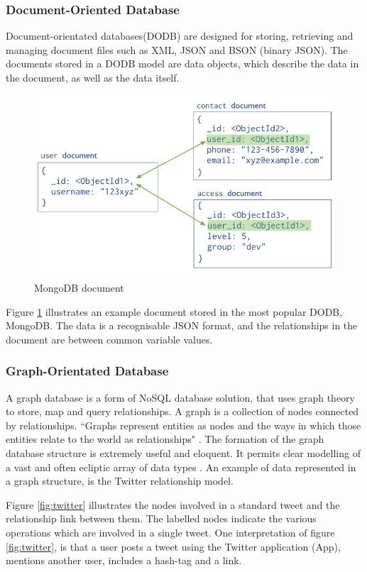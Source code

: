 \subsubsection{Document-Oriented Database}
Document-orientated databases(DODB) are designed for storing, retrieving and managing document files such as XML, JSON and BSON (binary JSON). The documents stored in a DODB model are data objects, which describe the data in the document, as well as the data itself. \begin{figure}[H]\begin{center}\includegraphics[width=0.75\linewidth]{images/mongodbmodel}\caption{MongoDB document}\label{fig:mongo}\end{center}\end{figure} Figure \ref{fig:mongo} illustrates an example document stored in the most popular DODB, MongoDB. The data is a recognisable JSON format, and the relationships in the document are between common variable values.

\subsubsection{Graph-Orientated Database}
A graph database is a form of NoSQL database solution, that uses graph theory to store, map and query relationships. A graph is a collection of nodes connected by relationships. ``Graphs represent entities as nodes and the ways in which those entities relate to the world as relationships" \cite{gd}. The formation of the graph database structure is extremely useful and eloquent. It permits clear modelling of a vast and often ecliptic array of data types \cite{gd}. An example of data represented in a graph structure, is the Twitter relationship model. 

Figure \ref{fig:twitter} illustrates the nodes involved in a standard tweet and the relationship link between them. The labelled nodes indicate the various operations which are involved in a single tweet. One interpretation of figure \ref{fig:twitter}, is that a user posts a tweet using the Twitter application (App), mentions another user, includes a hash-tag and a link.


